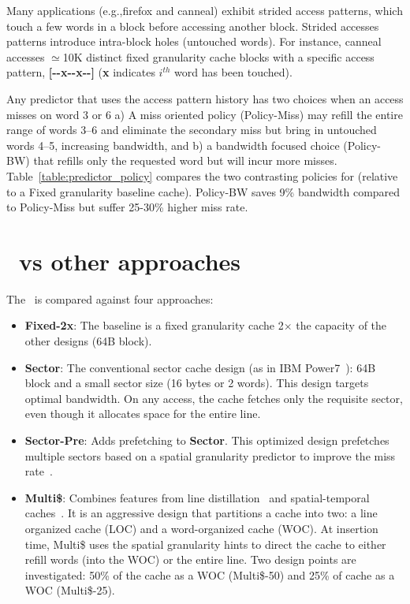 {{Many applications (e.g.,firefox and canneal) exhibit strided access patterns, which touch a few words in a block before accessing another block. Strided accesses patterns introduce intra-block holes (untouched words). For instance, canneal accesses $\simeq$10K distinct fixed granularity cache blocks  with a specific access pattern, \textbf{[{-}{-}x{-}{-}x{-}{-}]} (\textbf{x} indicates $i^{th}$ word has been touched). 



Any predictor that uses the access pattern history has two choices when an access misses on word 3 or 6 a) A miss oriented policy (Policy-Miss) may refill the entire range of words 3--6 and eliminate the secondary miss but bring in untouched words 4--5, increasing bandwidth, and b) a bandwidth focused choice (Policy- BW) that refills only the requested word but will incur more misses. Table~\ref{table:predictor_policy} compares the two contrasting policies for \AC{} (relative to a Fixed granularity baseline cache). Policy-BW saves 9\% bandwidth compared to Policy-Miss but suffer 25-30\% higher miss rate.

\section{\AC\ vs other approaches}
\label{sec:otherapproaches}

The \AC\ is compared against four approaches:

\begin{itemize}
  \item \textbf{Fixed-2x}: The baseline is a fixed granularity cache 2$\times$ the capacity of the other designs (64B block).
  \item \textbf{Sector}: The conventional sector cache design (as in IBM Power7~\cite{power7}): 64B block and a small sector size (16 bytes or 2 words).  This design targets optimal bandwidth. On any access, the cache fetches only the requisite sector, even though it allocates space for the entire line.
  \item \textbf{Sector-Pre}: Adds prefetching to \textbf{Sector}. This optimized design prefetches multiple sectors based on a spatial granularity predictor to improve the miss rate~\cite{kumar-isca-1998, pujara-hpca-2006}.
  \item \textbf{Multi\$}: Combines features from line distillation~\cite{Qureshi:2007:LDIS} and spatial-temporal    caches~\cite{Gonzalez:1995:DCM:224538.224622}. It is an aggressive design that partitions a cache into two: a line organized cache (LOC) and a word-organized cache (WOC). At insertion time, Multi\$ uses the spatial granularity hints to direct the cache to either refill words (into the WOC) or the entire line. Two design points are investigated: 50\% of the cache as a WOC (Multi\$-50) and 25\% of cache as a WOC (Multi\$-25).
\end{itemize}

}}
